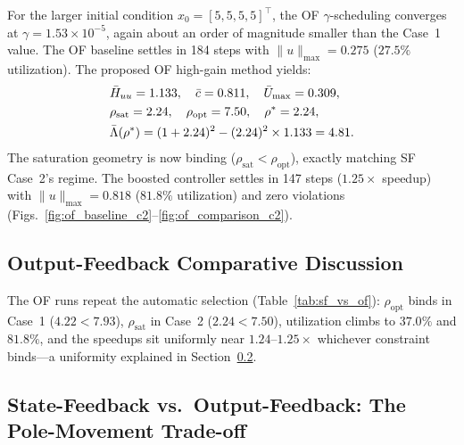 \documentclass[final,5p,times,authoryear]{elsarticle}
\theoremstyle{plain}
\theoremstyle{definition}
\theoremstyle{remark}
\begin{document}
For the larger initial condition $x_0 = [5, 5, 5, 5]^\top$, the OF
$\gamma$-scheduling converges at $\gamma = 1.53 \times 10^{-5}$, again
about an order of magnitude smaller than the Case~1 value.  The OF
baseline settles in 184 steps with $\|u\|_{\max} = 0.275$ ($27.5\%$
utilization).  The proposed OF high-gain method yields:
\begin{align}
&\bar H_{uu} = 1.133, \quad \bar c = 0.811, \quad \bar U_{\max} = 0.309, \notag\\
&\rho_{\mathrm{sat}} = 2.24, \quad \rho_{\mathrm{opt}} = 7.50, \quad \rho^{*} = 2.24, \notag\\
&\bar\Lambda(\rho^{*}) = (1 + 2.24)^2 - (2.24)^2 \times 1.133 = 4.81.
\end{align}
The saturation geometry is now binding
($\rho_{\mathrm{sat}} < \rho_{\mathrm{opt}}$), exactly matching SF
Case~2's regime.  The boosted controller settles in 147 steps
($1.25\times$ speedup) with $\|u\|_{\max} = 0.818$ ($81.8\%$
utilization) and zero violations
(Figs.~\ref{fig:of_baseline_c2}--\ref{fig:of_comparison_c2}).



\subsection{Output-Feedback Comparative Discussion}
\label{sec:of_comparative}
The OF runs repeat the automatic selection
(Table~\ref{tab:sf_vs_of}): $\rho_{\mathrm{opt}}$ binds in Case~1
($4.22 < 7.93$), $\rho_{\mathrm{sat}}$ in Case~2 ($2.24 < 7.50$),
utilization climbs to $37.0\%$ and $81.8\%$, and the speedups sit
uniformly near $1.24$--$1.25\times$ whichever constraint binds---a
uniformity explained in Section~\ref{sec:pole_movement}.


\subsection{State-Feedback vs.\ Output-Feedback: The Pole-Movement Trade-off}
\label{sec:pole_movement}
\end{document}
